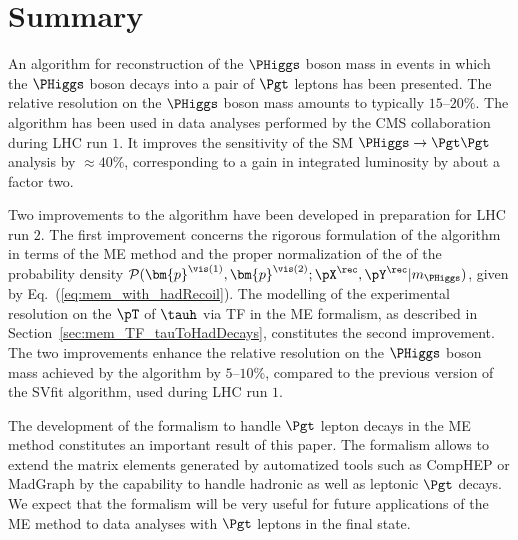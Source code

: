 \section{Summary}
\label{sec:summary}

An algorithm for reconstruction of the $\PHiggs$ boson mass in events
in which the $\PHiggs$ boson decays into a pair of $\Pgt$ leptons has been
presented.
The relative resolution on the $\PHiggs$ boson mass amounts to typically
$15$--$20\%$.
The algorithm has been used in data analyses performed by the CMS
collaboration during LHC run $1$.
It improves the sensitivity of the SM $\PHiggs \to \Pgt\Pgt$ analysis by $\approx 40\%$,
corresponding to a gain in integrated luminosity by about a factor two.

Two improvements to the algorithm have been developed in preparation
for LHC run $2$.
The first improvement concerns the rigorous formulation of the
algorithm in terms of the ME method
and the proper normalization of the of the probability density 
$\mathcal{P}(\bm{p}^{\vis(1)},\bm{p}^{\vis(2)};\pX^{\rec},\pY^{\rec}|m_{\PHiggs})$, given by Eq.~(\ref{eq:mem_with_hadRecoil}).
The modelling of the experimental resolution on the $\pT$ of $\tauh$ via TF in the ME
formalism, as described in Section~\ref{sec:mem_TF_tauToHadDecays}, constitutes the second improvement.
The two improvements enhance the relative resolution on the $\PHiggs$ boson mass
achieved by the algorithm by $5$--$10\%$, 
compared to the previous version of the SVfit algorithm, used during LHC run $1$.

The development of the formalism to handle $\Pgt$ lepton decays
in the ME method constitutes an important result of this paper.
The formalism allows to extend the matrix elements generated by automatized tools such as
CompHEP or MadGraph by the capability to handle hadronic as well as leptonic $\Pgt$ decays.
We expect that the formalism will be very useful for future
applications of the ME method to data analyses with $\Pgt$ leptons in
the final state. 
